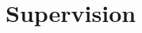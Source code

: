 \documentclass[9pt,a4paper]{article}
\newcommand{\LastName}{Doolittle}
\newcommand{\Initials}{E.}
\newcommand{\Me}{\underline{\LastName, \Initials}}  %
\newcommand{\Year}[1]{\fontsize{10pt}{0}\selectfont \texttt{#1}}
\newcommand{\DOI}[1]{doi:\href{https://doi.org/#1}{#1}}
\newcommand{\GitHub}[1]{\faGithub{} \href{https://github.com/#1}{#1}}
\newcommand{\Data}[1]{\faChartBar{} doi:\href{https://doi.org/#1}{#1}}
\begin{document}

\section{Supervision}
\end{document}
